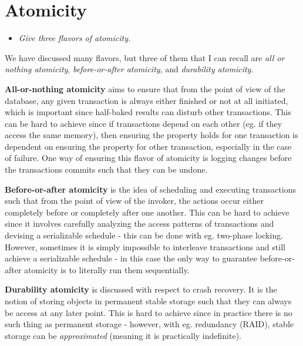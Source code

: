 \newpage
\section{Atomicity}

\begin{itemize}
  \item  \textit{Give three flavors of atomicity.}
\end{itemize}


We have discussed many flavors, but three of them that I can recall are
\emph{all or nothing atomicity}, \emph{before-or-after atomicity}, and
\emph{durability atomicity}.
\medskip


\textbf{All-or-nothing atomicity} aims to ensure that from the point of view of
the database, any given transaction is always either finished or not at all
initiated, which is important since half-baked results can disturb other
transactions. This can be hard to achieve since if transactions depend on each
other (eg. if they access the same memory), then ensuring the property holds for
one transaction is dependent on ensuring the property for other transaction,
especially in the case of failure. One way of ensuring this flavor of atomicity
is logging changes before the transactions commits such that they can be undone.
\medskip

\textbf{Before-or-after atomicity} is the idea of scheduling and executing
transactions such that from the point of view of the invoker, the actions occur
either completely before or completely after one another. This can be hard to
achieve since it involves carefully analyzing the access patterns of
transactions and devising a serializable schedule - this can be done with eg.
two-phase locking. However, sometimes it is simply impossible to interleave
transactions and still achieve a serializable schedule - in this case the only
way to guarantee before-or-after atomicity is to literally run them
sequentially.
\medskip

\textbf{Durability atomicity} is discussed with respect to crash recovery. It is
the notion of storing objects in permanent stable storage such that they can
always be access at any later point. This is hard to achieve since in practice
there is no such thing as permanent storage - however, with eg. redundancy
(RAID), stable storage can be \emph{approximated} (meaning it is practically
indefinite).

\Sectend
